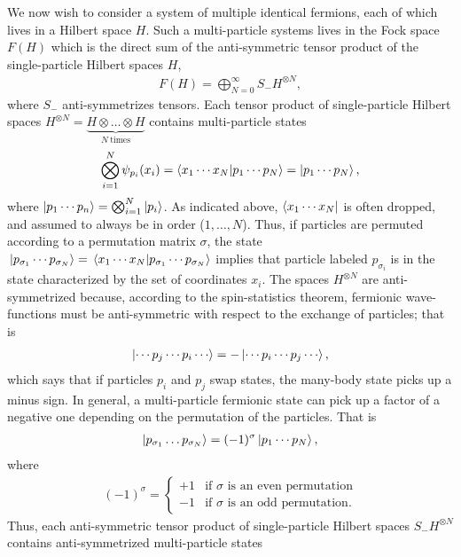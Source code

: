 \documentclass[10pt]{article}
\begin{document}
We now wish to consider a system of multiple identical fermions, each of which lives in a Hilbert space $H$. Such a multi-particle systems lives in the Fock space $F(H)$ which is the direct sum of the anti-symmetric tensor product of the single-particle Hilbert spaces $H$,
\begin{align}
F(H)
=
\bigoplus_{N=0}^\infty S_-H^{\otimes N},
\end{align}
where $S_-$ anti-symmetrizes tensors. Each tensor product of single-particle Hilbert spaces $H^{\otimes N} = \underset{N \ \text{times}}{\underbrace{H\otimes\ldots \otimes H}}$ contains multi-particle states
\begin{align}
\bigotimes_{i=1}^N\psi_{p_i}(x_i)
=
\bra{x_1\cdots x_N}\ket{p_1\cdots p_N}
= 
\ket{p_1\cdots p_N},
\end{align}
where $\ket{p_1\cdots p_n}=\bigotimes_{i=1}^N\ket{p_i}$. As indicated above, $\bra{x_1\cdots x_N}$ is often dropped, and assumed to always be in order ($1,\ldots ,N$). Thus, if particles are permuted according to a permutation matrix $\sigma$, the state $\ket*{p_{\sigma_1}\cdots p_{\sigma_N}} = \bra*{x_1\cdots x_N}\ket*{p_{\sigma_1}\cdots p_{\sigma_N}}$
implies that particle labeled $p_{\sigma_i}$ is in the state characterized by the set of coordinates $x_i$. The spaces $H^{\otimes N}$ are anti-symmetrized because, according to the spin-statistics theorem, fermionic wave-functions must be anti-symmetric with respect to the exchange of particles; that is
\begin{align}
\ket{\cdots p_j \cdots p_i \cdots} = - \ket{\cdots p_i \cdots p_j \cdots},
\end{align}
which says that if particles $p_i$ and $p_j$ swap states, the many-body state picks up a minus sign. In general, a multi-particle fermionic state can pick up a factor of a negative one depending on the permutation of the particles. That is
\begin{align}
\ket{p_{{\sigma_1}}\ldots p_{{\sigma_N}}} = (-1)^\sigma\ket{p_1\cdots p_N},
\end{align}
where 
\begin{align}
(-1)^\sigma 
=
\begin{cases}
+1 & \text{if $\sigma$ is an even permutation}
\\
-1 & \text{if $\sigma$ is an odd permutation}.
\end{cases}
\end{align}
Thus, each anti-symmetric tensor product of single-particle Hilbert spaces $S_-H^{\otimes N}$ contains anti-symmetrized multi-particle states
\end{document}
